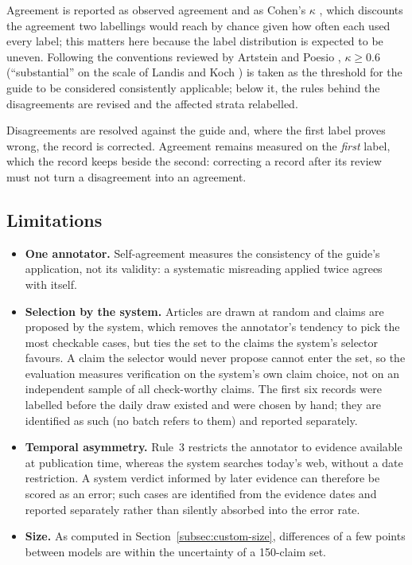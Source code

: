 Agreement is reported as observed agreement and as Cohen's $\kappa$
\cite{cohen1960coefficient}, which discounts the agreement two
labellings would reach by chance given how often each used every
label; this matters here because the label distribution is expected
to be uneven. Following the conventions reviewed by Artstein and
Poesio \cite{artstein2008intercoder}, $\kappa \geq 0.6$ (``substantial''
on the scale of Landis and Koch \cite{landis1977measurement}) is taken
as the threshold for the guide to be considered consistently
applicable; below it, the rules behind the disagreements are revised
and the affected strata relabelled.

Disagreements are resolved against the guide and, where the first
label proves wrong, the record is corrected. Agreement remains
measured on the \emph{first} label, which the record keeps beside the
second: correcting a record after its review must not turn a
disagreement into an agreement.

\subsection{Limitations}
\label{subsec:custom-limitations}

\begin{itemize}
    \item \textbf{One annotator.} Self-agreement measures the
    consistency of the guide's application, not its validity: a
    systematic misreading applied twice agrees with itself.
    \item \textbf{Selection by the system.} Articles are drawn at
    random and claims are proposed by the system, which removes the
    annotator's tendency to pick the most checkable cases, but ties
    the set to the claims the system's selector favours. A claim the
    selector would never propose cannot enter the set, so the
    evaluation measures verification on the system's own claim
    choice, not on an independent sample of all check-worthy claims.
    The first six records were labelled before the daily draw existed
    and were chosen by hand; they are identified as such (no batch
    refers to them) and reported separately.
    \item \textbf{Temporal asymmetry.} Rule~3 restricts the
    annotator to evidence available at publication time, whereas the
    system searches today's web, without a date restriction. A system
    verdict informed by later evidence can therefore be scored as an
    error; such cases are identified from the evidence dates and
    reported separately rather than silently absorbed into the error
    rate.
    \item \textbf{Size.} As computed in
    Section~\ref{subsec:custom-size}, differences of a few points
    between models are within the uncertainty of a 150-claim set.
\end{itemize}

